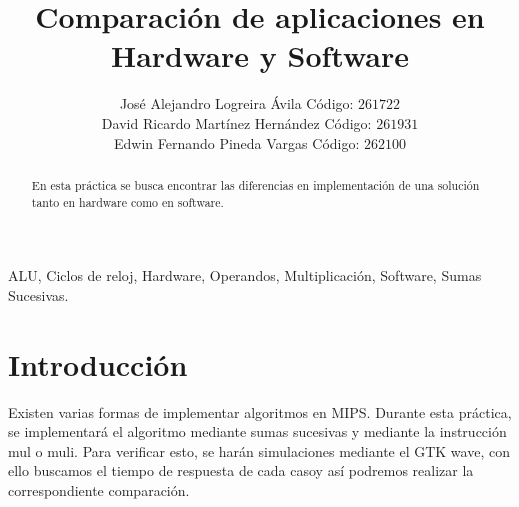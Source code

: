 \documentclass[twocolumn]{IEEEtran}
\begin{document}
\title{Comparación de aplicaciones en Hardware y Software}
\author{José Alejandro Logreira Ávila Código: $261722$\\
	David Ricardo Martínez Hernández Código: $261931$\\
	Edwin Fernando Pineda Vargas Código: $262100$}
\maketitle
{}
\begin{keywords}
 ALU, Ciclos de reloj, Hardware, Operandos, Multiplicación, Software, Sumas Sucesivas.
\end{keywords}
\begin{abstract}
 En esta práctica se busca encontrar las diferencias en implementación de una solución tanto en hardware como en software.
\end{abstract}

\section{Introducción}
\noindent
Existen varias formas de implementar algoritmos en MIPS. Durante esta práctica, se implementará el algoritmo mediante sumas sucesivas y mediante la instrucción mul o muli. Para verificar esto, se harán simulaciones mediante el GTK wave, con ello buscamos el tiempo de respuesta de cada casoy así podremos realizar la correspondiente comparación.
\end{document}
